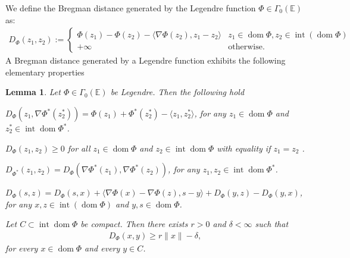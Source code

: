 \documentclass[11pt,onecolumn]{article}
\DeclareMathOperator{\dom}{dom}
\DeclareMathOperator{\intr}{int}
\newtheorem{lemma}[lemma]{Lemma}
\theoremstyle{remark}
\begin{document}
We define the Bregman distance generated by the Legendre function $\Phi \in \Gamma_0(\mathbb{E})$ as:
\begin{align}
D_\Phi(z_1,z_2):=\begin{cases}
\Phi(z_1) - \Phi(z_2) - \langle \nabla \Phi(z_2), z_1-z_2 \rangle & \text{$z_1 \in \dom \Phi, z_2 \in \intr (\dom \Phi)$} \\
+\infty &\text{otherwise.}
\end{cases}
\end{align}
A Bregman distance generated by a Legendre function exhibits the following elementary properties
\begin{lemma} \label{thm:dual_bregman}
Let $\Phi \in \Gamma_0(\mathbb{E})$ be Legendre. Then the following hold
\begin{lemenum}
    \item $D_{\Phi}(z_1, \nabla \Phi^*(z_2^*)) = \Phi(z_1) + \Phi^*(z_2^*) -\langle z_1,z_2^*\rangle$, for any $z_1 \in \dom \Phi$ and $z_2^* \in \intr \dom \Phi^*$. \label{thm:dual_bregman:one_sided}
    \item $D_{\Phi}(z_1, z_2) \geq 0$ for all $z_1 \in \dom \Phi$ and $z_2 \in \intr \dom \Phi$ with equality if $z_1 = z_2$ \label{thm:dual_bregman:nonnegative}.
    \item $D_{\Phi^*}(z_1, z_2) = D_{\Phi}(\nabla \Phi^*(z_1), \nabla \Phi^*(z_2))$, for any $z_1,z_2 \in \intr \dom \Phi^*$. {\normalfont\rmfamily\cite[Theorem 3.7(v)]{bauschke1997legendre} }\label{thm:dual_bregman:flip}
    \item $D_\Phi(s,z) = D_\Phi(s,x) + \langle \nabla \Phi(x) - \nabla \Phi(z), s-y \rangle + D_\Phi(y,z) - D_\Phi(y,x)$, for any $x,z \in \intr(\dom \Phi)$ and $y,s \in \dom \Phi$. {\normalfont\rmfamily\cite[Corollary 2.6]{solodov2000inexact}} \label{thm:dual_bregman:fourpoint}
    \item Let $C \subset \intr \dom \Phi$ be compact. Then there exists $r>0$ and $\delta < \infty$ such that \label{thm:affine_bounds}
\begin{align}
D_\Phi(x,y) \geq r\|x\| - \delta,
\end{align}  
for every $x \in \dom \Phi$ and every $y \in C$.
\end{lemenum}
\end{lemma}
\end{document}
